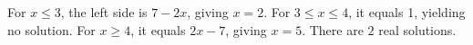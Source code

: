 For $x\le3$, the left side is $7-2x$, giving $x=2$. For $3\le x\le4$, it equals 1, yielding no solution. For $x\ge4$, it equals $2x-7$, giving $x=5$. There are $\boxed2$ real solutions.
